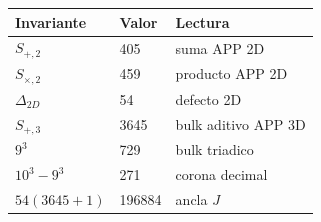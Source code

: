 \begin{tabular}{lll}\toprule
Invariante & Valor & Lectura\\\midrule
$S_{+,2}$ & 405 & suma APP 2D\\
$S_{\times,2}$ & 459 & producto APP 2D\\
$\Delta_{2D}$ & 54 & defecto 2D\\
$S_{+,3}$ & 3645 & bulk aditivo APP 3D\\
$9^3$ & 729 & bulk triadico\\
$10^3-9^3$ & 271 & corona decimal\\
$54(3645+1)$ & 196884 & ancla $J$\\
\bottomrule\end{tabular}